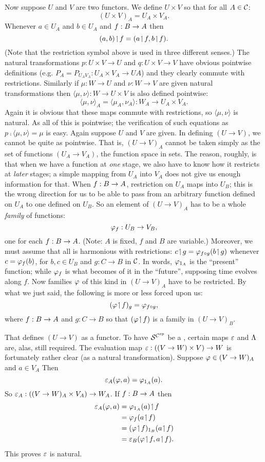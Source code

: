 Now suppose $U$ and $V$ are two functors. We define $U \times V$ so that for all $A \in \mathcal C$:
$$
(U \times V)_A = U_A \times V_A .
$$
%
Whenever $a \in U_A$ and $b \in U_A$ and $f: B \rightarrow A$ then
$$
(a,b) \!\upharpoonleft\! f = (a \!\upharpoonleft\! f, b \!\upharpoonleft\! f) .
$$
(Note that the restriction symbol above is used in three different senses.) The natural transformations $p : U \times V \to U$ and $q: U\times V \to V$ have obvious pointwise definitions  (e.g. $P_A= P_{{U_A}{V_A}} : U_A \times V_A \to UA$) and they clearly commute with restrictions. Similarly if $\mu: W \to U$ and $\nu: W\to V$ are given natural transformations then $\langle \mu, \nu \rangle: W \to U \times V$ is also defined pointwise:
$$
{\langle \mu, \nu \rangle}_A = \langle \mu_A, \nu_A \rangle : W_A \to U_A \times V_A .
$$
%
Again it is obvious that these maps commute with restrictions, so ${\langle \mu, \nu \rangle}$ is natural. As all of this is pointwise; the verification of such equations as $p \comp \langle \mu, \nu \rangle = \mu$ is easy. Again suppose $U$ and $V$ are given. In defining $(U \to V)$, we cannot be quite as pointwise. That is, $(U \to V)_A$ cannot be taken simply as the set of functions $(U_A \to V_A)$, the function space in sets. The reason, roughly, is that when we have a function at {\it one} stage, we also have to know how it restricts at {\it later} stages; a simple mapping from $U_A$ into $V_A$ does not give us enough information for that. When $f : B \rightarrow A$, restriction on
$U_A$ maps into $U_B$; this is the wrong direction for us to be able to pass from an arbitrary function defined on $U_A$ to one defined on $U_B$. So an element of $(U \to V)_A$ has to be a whole {\it family} of functions:
$$
\varphi_f: U_B \rightarrow V_B,
$$
%
one for each $f: B \rightarrow A$. (Note: $A$ is fixed, $f$ and $B$ are variable.) Moreover, we must assume that all is harmonious with
restrictions: $c \!\upharpoonleft\! g = \varphi_{f \circ g} (b \!\upharpoonleft\! g)$ whenever $c = \varphi_f(b)$, for $b,c \in U_B$ and $g : C\to B$ in $\mathcal C$. In words, $\varphi_{{\mathrm 1}_A}$ is the ``present'' function; while $\varphi_f$ is what becomes of it in the ``future'', supposing time evolves along $f$. Now families $\varphi$ of this kind in
$(U\to V)_A$ have to be restricted. By what we just said, the following is more or less forced upon us:
$$
(\varphi \!\upharpoonleft\! f)_g = \varphi_{f\circ g},
$$
%
where $f : B \rightarrow A$ and $g: C\to B$ so that $(\varphi \!\upharpoonleft\! f)$ is a family in $(U\to V)_B$.

That defines $(U\to V)$ as a functor. To have $\mathcal S^{\mathcal C^{op}}$ be a \ccc, certain maps $\varepsilon$ and $\Lambda$ are, alas, still required. The evaluation map $\varepsilon : ((V\rightarrow W) \times V) \rightarrow W$ is fortunately rather clear (as a natural transformation). Suppose $\varphi \in (V \rightarrow W)_A$ and $a \in V_A$ Then
$$
\varepsilon_A(\varphi, a) = \varphi_{{\mathrm 1}_A} (a).
$$
%
So $\varepsilon_A : ((V \rightarrow W)_A \times V_A) \rightarrow W_A$. If $f: B \rightarrow A$ then
\begin{align*}
\ev_A(\ffam, a) &= \ffam_{\id_A}(a) \res f\\
&= \ffam_f(a \res f)\\
&= (\ffam \res f)_{\id_B} (a \res f)\\
&= \ev_B(\ffam \res f, a \res f).
\end{align*}
%
This proves $\varepsilon$ is natural.

